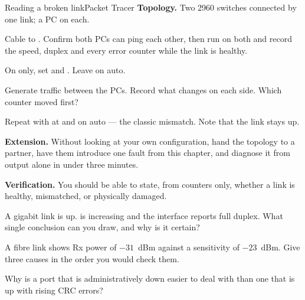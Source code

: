 \begin{lab}{Reading a broken link}{Packet Tracer}
\textbf{Topology.} Two 2960 switches connected by one link; a PC on each.

\begin{tasks}
  \item Cable  to . Confirm both PCs can ping each
        other, then run  on both and record the speed,
        duplex and every error counter while the link is healthy.
  \item On  only, set  and . Leave
         on auto.
  \item Generate traffic between the PCs. Record what changes on each side.
        Which counter moved first?
  \item Repeat with  at  and  on auto ---
        the classic mismatch. Note that the link stays up.
  \item \textbf{Extension.} Without looking at your own configuration, hand the
        topology to a partner, have them introduce one fault from this chapter,
        and diagnose it from  output alone in under three minutes.
\end{tasks}

\textbf{Verification.} You should be able to state, from counters only, whether
a link is healthy, mismatched, or physically damaged.
\end{lab}

\begin{checkpoint}
\begin{tightnum}
  \item A gigabit link is up.  is increasing and the interface
        reports full duplex. What single conclusion can you draw, and why is it
        certain?
  \item A fibre link shows Rx power of $-31$~dBm against a sensitivity of
        $-23$~dBm. Give three causes in the order you would check them.
  \item Why is a port that is administratively down easier to deal with than one
        that is up with rising CRC errors?
\end{tightnum}
\end{checkpoint}

